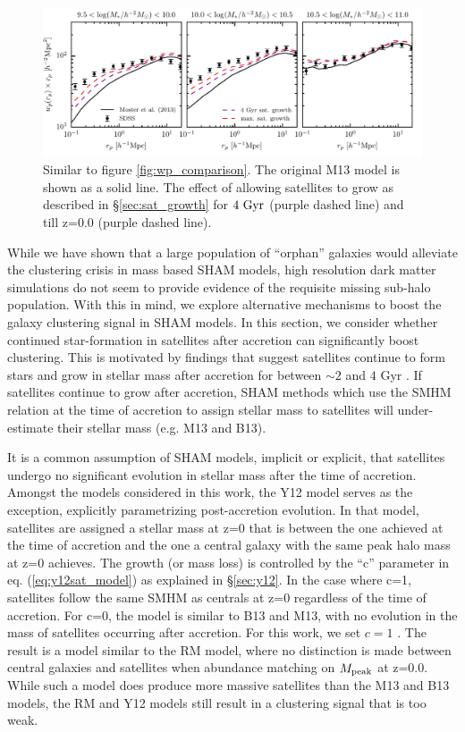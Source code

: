 \documentclass[a4paper,fleqn,usenatbib]{mnras}
\begin{document}
\begin{figure}
    \includegraphics{figures/wp_sat_growth_comparison.pdf}
    \caption{Similar to figure \ref{fig:wp_comparison}.  The original M13 model is shown as a solid line.  The effect of allowing satellites to grow as described in \S \ref{sec:sat_growth} for $4~{\rm Gyr}$ (purple dashed line) and till z=0.0 (purple dashed line).}
    \label{fig:wp_effect_comparison_sat_growth}
\end{figure}

While we have shown that a large population of ``orphan'' galaxies would alleviate the clustering crisis in mass based SHAM models, high resolution dark matter simulations do not seem to provide evidence of the requisite missing sub-halo population.  With this in mind, we explore alternative mechanisms to boost the galaxy clustering signal in SHAM models.  In this section, we consider whether continued star-formation in satellites after accretion can significantly boost clustering.  This is motivated by findings that suggest satellites continue to form stars and grow in stellar mass after accretion for between $\sim 2$ and $4$ Gyr \citep{Wetzel:2013dw}.  If satellites continue to grow after accretion, SHAM methods which use the SMHM relation at the time of accretion to assign stellar mass to satellites will under-estimate their stellar mass (e.g. M13 and B13).

It is a common assumption of SHAM models, implicit or explicit, that satellites undergo no significant evolution in stellar mass after the time of accretion.  Amongst the models considered in this work, the Y12 model serves as the exception, explicitly parametrizing post-accretion evolution.  In that model, satellites are assigned a stellar mass at z=0 that is between the one achieved at the time of accretion and the one a central galaxy with the same peak halo mass at z=0 achieves.  The growth (or mass loss) is controlled by the ``c'' parameter in eq. (\ref{eq:y12sat_model}) as explained in \S \ref{sec:y12}.  In the case where c=1, satellites follow the same SMHM as centrals at z=0 regardless of the time of accretion.  For c=0, the model is similar to B13 and M13, with no evolution in the mass of satellites occurring after accretion.  For this work, we set $c = 1$ \citep[consistent with SMF2 FIT-2PCF in table 4 in][]{Yang:2012ew}.  The result is a model similar to the RM model, where no distinction is made between central galaxies and satellites when abundance matching on $M_{\rm peak}$ at z=0.0.  While such a model does produce more massive satellites than the M13 and B13 models, the RM and Y12 models still result in a clustering signal that is too weak.
\end{document}
